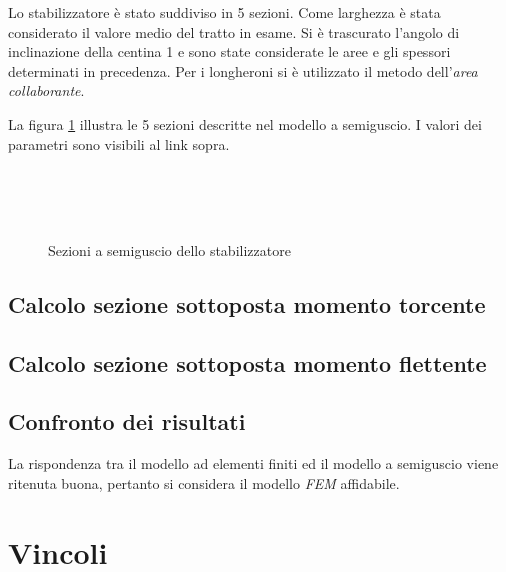 \documentclass[
10pt, %
a4paper, %
oneside, %
headinclude,footinclude, %
BCOR5mm, %
]{scrartcl}
\begin{document}
Lo stabilizzatore è stato suddiviso in 5 sezioni. Come larghezza è stata considerato il valore medio del tratto in esame. Si è trascurato l'angolo di inclinazione della centina 1 e sono state considerate le aree e gli spessori determinati in precedenza. Per i longheroni si è utilizzato il metodo dell'\emph{area collaborante}.

La figura \ref{fig:semiguscio} illustra le 5 sezioni descritte nel modello a semiguscio. I valori dei parametri sono visibili al link sopra.


\begin{figure}[tb]
	\centering
	 \quad
	 \\
	 \quad
	 \\
	 \\
	\caption[descrizione a semiguscio]{Sezioni a semiguscio dello stabilizzatore} %
	\label{fig:semiguscio}
\end{figure}


\subsection{Calcolo sezione sottoposta momento torcente}






\subsection{Calcolo sezione sottoposta momento flettente}




\subsection{Confronto dei risultati}

La rispondenza tra il modello ad elementi finiti ed il modello a semiguscio viene ritenuta buona, pertanto si considera il modello \emph{FEM} affidabile.

\newpage


\section{Vincoli}
\end{document}
